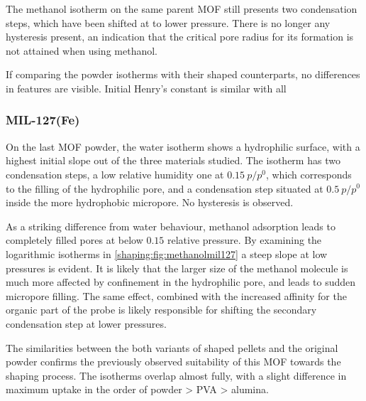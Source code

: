 The methanol isotherm on the same parent MOF still presents 
two condensation steps, which have been shifted at to 
lower pressure. There is no longer any hysteresis present,
an indication that the critical pore radius for its formation
is not attained when using methanol.

If comparing the powder isotherms with their shaped counterparts,
no differences in features are visible. Initial Henry's constant 
is similar with all  

\subsubsection{MIL-127(Fe)}

On the last MOF powder, the water isotherm shows a hydrophilic
surface, with a highest initial slope out of the three 
materials studied. The isotherm has two condensation steps,
a low relative humidity one at \(0.15~p/p^0\), which corresponds
to the filling of the hydrophilic pore, and a condensation 
step situated at \(0.5~p/p^0\) inside the more hydrophobic micropore.
No hysteresis is observed.

As a striking difference from water behaviour, methanol adsorption
leads to completely filled pores at below \(0.15\) relative 
pressure. By examining the logarithmic isotherms in 
\autoref{shaping:fig:methanolmil127} a steep slope at low
pressures is evident. It is likely that the larger size of the
methanol molecule is much more affected by confinement in 
the hydrophilic pore, and leads to sudden micropore filling.
The same effect, combined with the increased affinity for the 
organic part of the probe is likely responsible for shifting the 
secondary condensation step at lower pressures.

The similarities between the both variants of shaped pellets 
and the original powder confirms the previously observed 
suitability of this MOF towards the shaping process. The isotherms
overlap almost fully, with a slight difference in maximum uptake
in the order of powder > PVA > alumina.
